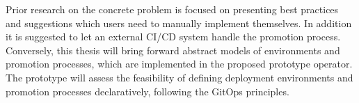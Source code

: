 Prior research on the concrete problem is focused on presenting
best practices and suggestions
which users need to manually implement themselves.
In addition it is suggested to let an external CI/CD system handle the promotion process.
Conversely, this thesis will bring forward
abstract models of environments and promotion processes,
which are implemented in the proposed prototype operator.
The prototype will assess the feasibility of
defining deployment environments and promotion processes declaratively,
following the GitOps principles.





























%
%
%
%
%
%
%
%






